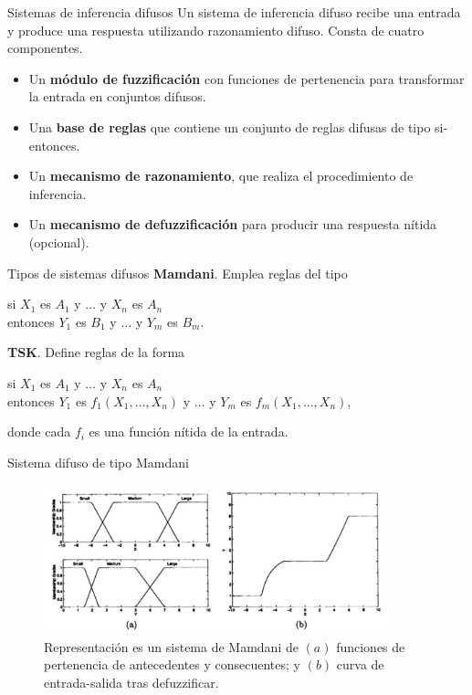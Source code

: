 \documentclass[spanish]{beamer}
\begin{document}
\begin{frame}{Sistemas de inferencia difusos}
	Un sistema de inferencia difuso recibe una entrada y produce una respuesta utilizando razonamiento difuso. Consta de cuatro componentes.

	\begin{itemize}
	\item Un \textbf{módulo de fuzzificación} con funciones de pertenencia para transformar la entrada en conjuntos difusos.
	\item Una \textbf{base de reglas} que contiene un conjunto de reglas difusas de tipo si-entonces.
	\item Un \textbf{mecanismo de razonamiento}, que realiza el procedimiento de inferencia.
  \item Un \textbf{mecanismo de defuzzificación} para producir una respuesta nítida (opcional).
\end{itemize}

\end{frame}

\begin{frame}{Tipos de sistemas difusos}
\textbf{Mamdani}. Emplea reglas del tipo
  \begin{center}
  si $X_1$ es $A_1$ y $\dots$ y $X_n$ es $A_n$\\
  entonces $Y_1$ es $B_1$ y $\dots$ y $Y_m$ es $B_m$.
\end{center}
\vspace{1em}
\pause
\textbf{TSK}. Define reglas de la forma
\begin{center}
  si $X_1$ es $A_1$ y $\dots$ y $X_n$ es $A_n$\\
  entonces $Y_1$ es $f_1(X_1, \dots, X_n)$ y $\dots$ y $Y_m$ es $f_m(X_1, \dots, X_n)$,
\end{center}
    donde cada $f_i$ es una función nítida de la entrada.

\end{frame}

\begin{frame}{Sistema difuso de tipo Mamdani}
\begin{figure}
	\centering
	\includegraphics[width=27em]{img/mamdani}
	\caption{\footnotesize Representación es un sistema de Mamdani de $(a)$ funciones de pertenencia de antecedentes y consecuentes; y $(b)$ curva de entrada-salida tras defuzzificar.}
\end{figure}
\end{frame}
\end{document}
